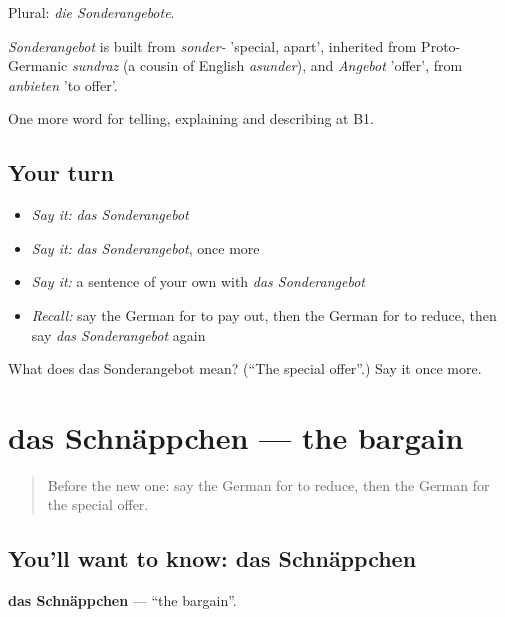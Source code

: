 Plural: \emph{die Sonderangebote}.

\begin{cousinweb}
\emph{Sonderangebot} is built from \emph{sonder-} 'special, apart', inherited from Proto-Germanic \emph{sundraz} (a cousin of English \emph{asunder}), and \emph{Angebot} 'offer', from \emph{anbieten} 'to offer'.
\end{cousinweb}

\begin{grammarlens}[title={What you've built}]
One more word for telling, explaining and describing at B1.
\end{grammarlens}

\subsection*{Your turn}
\begin{itemize}
\raggedright
  \item \emph{Say it:} \emph{das Sonderangebot}
  \item \emph{Say it:} \emph{das Sonderangebot}, once more
  \item \emph{Say it:} a sentence of your own with \emph{das Sonderangebot}
  \item \emph{Recall:} say the German for to pay out, then the German for to reduce, then say \emph{das Sonderangebot} again
\end{itemize}

\begin{tcolorbox}[breakable,colback=teal!4,colframe=teal!35!black,title={Before you move on}]
What does das Sonderangebot mean? (\textquotedblleft{}The special offer\textquotedblright{}.) Say it once more.
\end{tcolorbox}
\section[das Schnäppchen]{das Schnäppchen — the bargain}

\label{lesson:GE-C451-schnaeppchen}



\begin{quote}
Before the new one: say the German for to reduce, then the German for the special offer.
\end{quote}

\subsection*{You'll want to know: das Schnäppchen}
\textbf{das Schnäppchen} — \textquotedblleft{}the bargain\textquotedblright{}.

